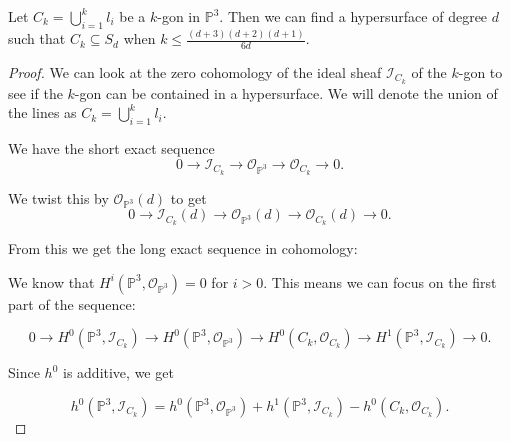 \begin{proposition}
    Let $C_k = \bigcup_{i=1}^k l_i$ be a $k$-gon in $\mathbb{P}^3$. Then we can find a hypersurface of degree $d$ such that $C_k \subseteq S_d$ when $k \leq \frac{(d+3)(d+2)(d+1)}{6d}$.
\end{proposition}

\begin{proof}

    We can look at the zero cohomology of the ideal sheaf $\mathcal{I}_{C_k}$ of the $k$-gon to see if the $k$-gon can be contained in a hypersurface. We will denote the union of the lines as $C_k = \bigcup_{i=1}^k l_i$. 

    We have the short exact sequence
    \[0 \to \mathcal{I}_{C_k} \to \mathcal{O}_{\mathbb{P}^3}\to \mathcal{O}_{C_k} \to 0.\]

    We twist this by $\mathcal{O}_{\mathbb{P}^3}(d)$ to get
    \[0 \to \mathcal{I}_{C_k}(d) \to \mathcal{O}_{\mathbb{P}^3}(d) \to \mathcal{O}_{C_k}(d) \to 0.\]

    From this we get the long exact sequence in cohomology:


    We know that $H^i(\mathbb{P}^3, \mathcal{O}_{\mathbb{P}^3}) = 0$ for $i > 0$. This means we can focus on the first part of the sequence:

    \[0 \to H^0(\mathbb{P}^3, \mathcal{I}_{C_k}) \to H^0(\mathbb{P}^3, \mathcal{O}_{\mathbb{P}^3}) \to H^0(C_k, \mathcal{O}_{C_k}) \to H^1(\mathbb{P}^3, \mathcal{I}_{C_k}) \to 0.\] 


    Since $h^0$ is additive, we get

    \[
    h^0(\mathbb{P}^3, \mathcal{I}_{C_k}) = h^0(\mathbb{P}^3, \mathcal{O}_{\mathbb{P}^3}) + h^1(\mathbb{P}^3, \mathcal{I}_{C_k}) - h^0(C_k, \mathcal{O}_{C_k}). 
    \]


\end{proof}
